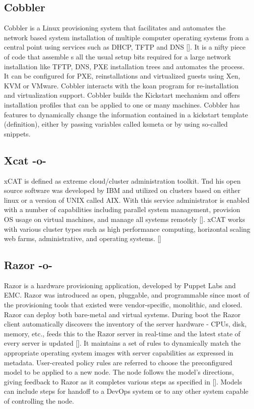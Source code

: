 \subsection{Cobbler}

Cobbler is a Linux provisioning system that facilitates and automates
the network based system installation of multiple computer operating
systems from a central point using services such as DHCP, TFTP and
DNS [\cite{www-cobbler}]. It is a nifty piece of code that assemble s
all the usual setup bits required for a large network installation
like TFTP, DNS, PXE installation trees and automates the process. It
can be configured for PXE, reinstallations and virtualized guests
using Xen, KVM or VMware.  Cobbler interacts with the koan program for
re-installation and virtualization support.  Cobbler builds the
Kickstart mechanism and offers installation profiles that can be
applied to one or many machines.  Cobbler has features to dynamically
change the information contained in a kickstart template (definition),
either by passing variables called ksmeta or by using so-called
snippets.

\subsection{Xcat -o-}

xCAT is defined as extreme cloud/cluster administration toolkit. Tnd
his open source software was developed by IBM and utilized on clusters
based on either linux or a version of UNIX called AIX. With this
service administrator is enabled with a number of capabilities
including parallel system management, provision OS usage on virtual
machines, and manage all systems remotely [\cite{www-xcat}]. xCAT works
with various cluster types such as high performance computing,
horizontal scaling web farms, administrative, and operating
systems. [\cite{www-03ibm}]


     
\subsection{Razor -o-}

Razor is a hardware provisioning application, developed by Puppet Labs
and EMC. Razor was introduced as open, pluggable, and programmable
since most of the provisioning tools that existed were
vendor-specific, monolithic, and closed. Razor can deploy both
bare-metal and virtual systems. During boot the Razor client
automatically discovers the inventory of the server hardware - CPUs,
disk, memory, etc., feeds this to the Razor server in real-time and
the latest state of every server is updated [\cite{www-RazorWiki}]. It
maintains a set of rules to dynamically match the appropriate
operating system images with server capabilities as expressed in
metadata. User-created policy rules are referred to choose the
preconfigured model to be applied to a new node. The node follows the
model's directions, giving feedback to Razor as it completes various
steps as specified in [\cite{www-RazorPuppet}]. Models can include steps
for handoff to a DevOps system or to any other system capable of
controlling the node.



